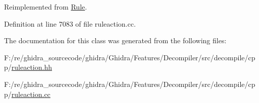 Reimplemented from \mbox{\hyperlink{class_rule_a4023bfc7825de0ab866790551856d10e}{Rule}}.



Definition at line 7083 of file ruleaction.\+cc.



The documentation for this class was generated from the following files\+:\begin{DoxyCompactItemize}
\item 
F\+:/re/ghidra\+\_\+sourcecode/ghidra/\+Ghidra/\+Features/\+Decompiler/src/decompile/cpp/\mbox{\hyperlink{ruleaction_8hh}{ruleaction.\+hh}}\item 
F\+:/re/ghidra\+\_\+sourcecode/ghidra/\+Ghidra/\+Features/\+Decompiler/src/decompile/cpp/\mbox{\hyperlink{ruleaction_8cc}{ruleaction.\+cc}}\end{DoxyCompactItemize}
